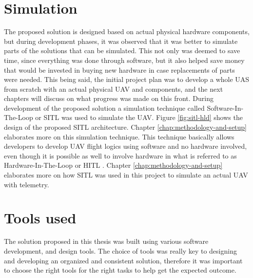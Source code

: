 



\section{Simulation}
\label{sec:simulation}

The proposed solution is designed based on actual physical hardware components, but during development phases, it was observed that it was better to simulate parts of the solutions that can be simulated. This not only was deemed to save time, since everything was done through software, but it also helped save money that would be invested in buying new hardware in case replacements of parts were needed. This being said, the initial project plan was to develop a whole UAS from scratch with an actual physical UAV and components, and the next chapters will discuss on what progress was made on this front. During development of the proposed solution a simulation technique called Software-In-The-Loop or SITL \cite{Giese2021} was used to simulate the UAV. Figure \ref{fig:sitl-hld} shows the design of the proposed SITL architecture. Chapter \ref{chap:methodology-and-setup} elaborates more on this simulation technique. This technique basically allows developers to develop UAV flight logics using software and no hardware involved, even though it is possible as well to involve hardware in what is referred to as Hardware-In-The-Loop or HITL \cite{px4hitluserguide}. Chapter \ref{chap:methodology-and-setup} elaborates more on how SITL was used in this project to simulate an actual UAV with telemetry.




\section{Tools used}
\label{sec:tools-used}

The solution proposed in this thesis was built using various software development, and design tools. The choice of tools was really key to designing and developing an organized and consistent solution, therefore it was important to choose the right tools for the right tasks to help get the expected outcome.

